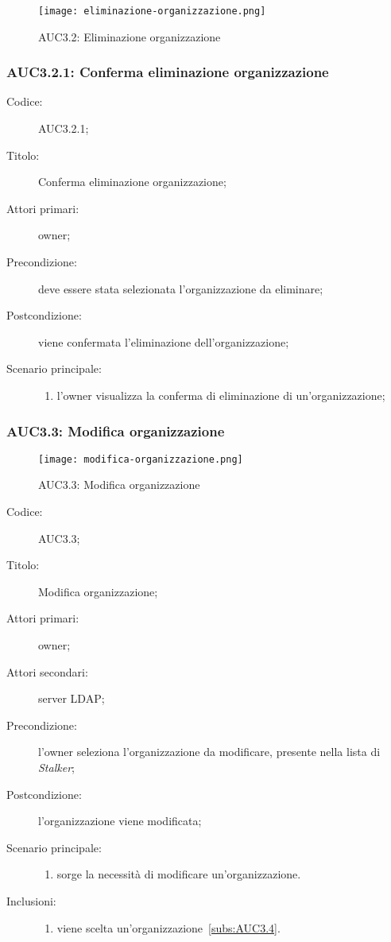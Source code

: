 \documentclass[../../../analisi-dei-requisiti.tex]{subfiles}
\begin{document}
\begin{figure}[H]
  \centering
  \texttt{[image: eliminazione-organizzazione.png]}
  \caption{AUC3.2: Eliminazione organizzazione}%
  \label{fig:AUC3.2}
\end{figure}

\subsubsection{AUC3.2.1: Conferma eliminazione organizzazione}%
\label{subs:AUC3.2.1}
\begin{description}
  \item[Codice:] AUC3.2.1;
  \item[Titolo:] Conferma eliminazione organizzazione;
  \item[Attori primari:] owner;
  \item[Precondizione:] deve essere stata selezionata l'organizzazione da eliminare;
  \item[Postcondizione:] viene confermata l'eliminazione dell'organizzazione;
  \item[Scenario principale:]
        \begin{enumerate}
          \item l'owner visualizza la conferma di eliminazione di un'organizzazione;
        \end{enumerate}
\end{description}

\subsubsection{AUC3.3: Modifica organizzazione}%
\label{subs:AUC3.3}

\begin{figure}[H]
  \centering
  \texttt{[image: modifica-organizzazione.png]}
  \caption{AUC3.3: Modifica organizzazione}%
  \label{fig:AUC3_3}
\end{figure}

\begin{description}
  \item[Codice:] AUC3.3;
  \item[Titolo:] Modifica organizzazione;
  \item[Attori primari:] owner;
  \item[Attori secondari:] server LDAP\@;
  \item[Precondizione:] l'owner seleziona l'organizzazione da modificare, presente nella lista di \emph{Stalker};
  \item[Postcondizione:] l'organizzazione viene modificata;
  \item[Scenario principale:]
        \begin{enumerate}
          \item sorge la necessità di modificare un'organizzazione.
        \end{enumerate}
  \item[Inclusioni:]
        \begin{enumerate}
          \item viene scelta un'organizzazione~\ref{subs:AUC3.4}.
        \end{enumerate}
\end{description}
\end{document}
